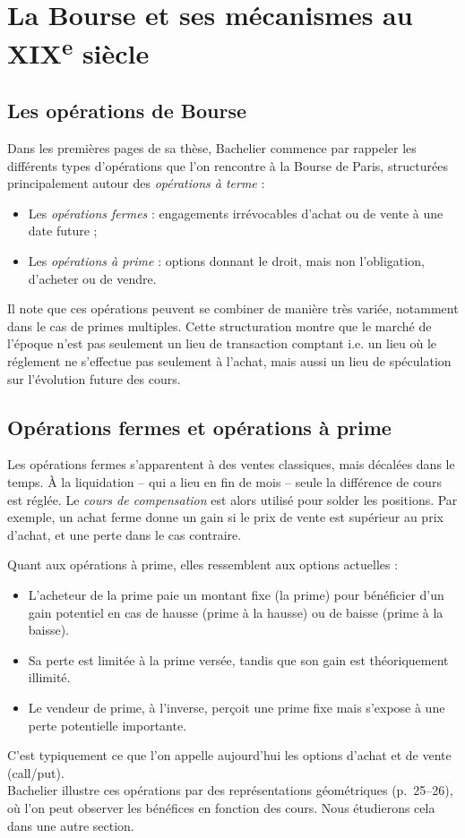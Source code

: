 \documentclass[12pt,a4paper]{article}
\begin{document}
\section{La Bourse et ses mécanismes au XIX\textsuperscript{e} siècle}

\subsection{Les opérations de Bourse}

Dans les premières pages de sa thèse, Bachelier commence par rappeler les différents types d'opérations que l’on rencontre à la Bourse de Paris, structurées principalement autour des \textit{opérations à terme} :

\begin{itemize}
  \item Les \textit{opérations fermes} : engagements irrévocables d'achat ou de vente à une date future ;
  \item Les \textit{opérations à prime} : options donnant le droit, mais non l'obligation, d’acheter ou de vendre.
\end{itemize}

Il note que ces opérations peuvent se combiner de manière très variée, notamment dans le cas de primes multiples. Cette structuration montre que le marché de l’époque n’est pas seulement un lieu de transaction comptant i.e. un lieu où le réglement ne s'effectue pas seulement à l'achat, mais aussi un lieu de spéculation sur l’évolution future des cours.

\subsection{Opérations fermes et opérations à prime}

Les opérations fermes s’apparentent à des ventes classiques, mais décalées dans le temps. À la liquidation -- qui a lieu en fin de mois -- seule la différence de cours est réglée. Le \textit{cours de compensation} est alors utilisé pour solder les positions. Par exemple, un achat ferme donne un gain si le prix de vente est supérieur au prix d’achat, et une perte dans le cas contraire.

Quant aux opérations à prime, elles ressemblent aux options actuelles :
\begin{itemize}
  \item L’acheteur de la prime paie un montant fixe (la prime) pour bénéficier d’un gain potentiel en cas de hausse (prime à la hausse) ou de baisse (prime à la baisse).
  \item Sa perte est limitée à la prime versée, tandis que son gain est théoriquement illimité.
  \item Le vendeur de prime, à l’inverse, perçoit une prime fixe mais s’expose à une perte potentielle importante.
\end{itemize}
C'est typiquement ce que l'on appelle aujourd'hui les options d'achat et de vente (call/put).\\
Bachelier illustre ces opérations par des représentations géométriques (p.~25–26), où l'on peut observer les bénéfices en fonction des cours. Nous étudierons cela dans une autre section.
\end{document}
